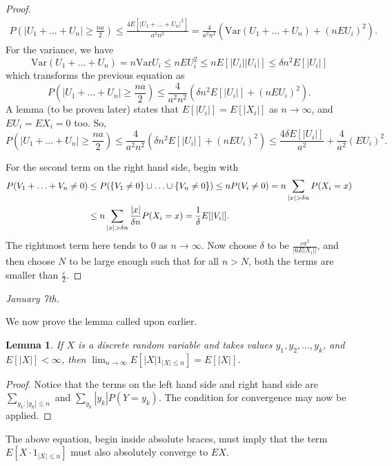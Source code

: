 \documentclass[15pt,a4paper]{book}
\newtheorem{lemma}[theorem]{Lemma}
\theoremstyle{definition}
\newcommand{\abs}[1]{\left| #1 \right|} %
\begin{document}
\begin{proof}
\begin{align}
        P\left(\abs{U_{1} + \ldots + U_{n}} \geq \frac{na}{2}\right) \leq \frac{4E[\abs{U_{1}+\ldots+U_{n}}^{2}]}{a^{2}n^{2}} = \frac{4}{a^{2}n^{2}} \left( \text{Var}(U_{1} + \ldots + U_{n}) + (nEU_{i})^{2} \right).
    \end{align}
    For the variance, we have
    \begin{equation}
        \text{Var}(U_{1}+\ldots+U_{n}) = n \text{Var}U_{i} \leq n EU_{i}^{2} \leq n E[\abs{U_{i}}\abs{U_{i}}] \leq \delta n^{2} E[\abs{U_{i}}]
    \end{equation}
    which transforms the previous equation as
    \begin{equation}
        P\left(\abs{U_{1} + \ldots + U_{n}} \geq \frac{na}{2}\right) \leq \frac{4}{a^{2}n^{2}} \left( \delta n^{2} E[\abs{U_{i}}] + (nEU_{i})^{2} \right).
    \end{equation}
    A lemma (to be proven later) states that $E[\abs{U_{i}}] = E[\abs{X_{i}}]$ as $n \to \infty$, and $EU_{i} = EX_{i} = 0$ too. So,
    \begin{equation}
        P\left(\abs{U_{1} + \ldots + U_{n}} \geq \frac{na}{2}\right) \leq \frac{4}{a^{2}n^{2}} \left( \delta n^{2} E[\abs{U_{i}}] + (nEU_{i})^{2} \right) \leq \frac{4 \delta E[\abs{U_{i}}]}{a^{2}} + \frac{4}{a^{2}} (EU_{i})^{2}.
    \end{equation}

    For the second term on the right hand side, begin with
    \begin{align}
        P(V_{1}+ \ldots + V_{n} \neq 0) &\leq P(\{V_{1} \neq 0\} \cup \ldots \cup \{V_{n} \neq 0\}) \leq nP(V_{i} \neq 0) = n \sum_{\abs{x} > \delta n} P(X_{i} = x) \notag \\
        &\leq n \sum_{\abs{x} > \delta n} \frac{\abs{x}}{\delta n} P(X_{i} = x) = \frac{1}{\delta} E[\abs{V_{i}}]. 
    \end{align}
    The rightmost term here tends to 0 as $n \to \infty$. Now choose $\delta$ to be $\frac{\varepsilon a^{2}}{\abs{6 E{\abs{X_{i}}}}}$, and then choose $N$ to be large enough such that for all $n > N$, both the terms are smaller than $\frac{\varepsilon}{2}$.
\end{proof}
\textit{January 7th.}

We now prove the lemma called upon earlier.
\begin{lemma}
    If $X$ is a discrete random variable and takes values $y_{1},y_{2},\ldots,y_{k}$, and $E[\abs{X}] < \infty$, then $\lim_{n \to \infty} E[\abs{X}1_{\abs{X} \leq n}] = E[\abs{X}]$.
\end{lemma}
\begin{proof}
    Notice that the terms on the left hand side and right hand side are $\sum_{y_{k} : \abs{y_{k}} \leq n}$ and $\sum_{y_{k}} \abs{y_{k}} P(Y = y_{k})$. The condition for convergence may now be applied.
\end{proof}
The above equation, begin inside absolute braces, must imply that the term $E[X \cdot 1_{\abs{X} \leq n}]$ must also absolutely converge to $EX$.
\end{document}
